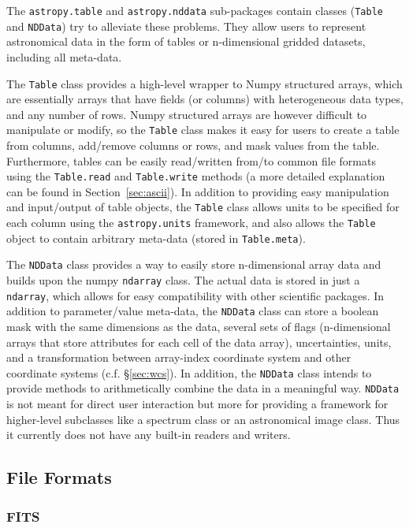 \documentclass[traditabstract]{aa}
\begin{document}
The \texttt{astropy.table} and \texttt{astropy.nddata} sub-packages contain
classes (\texttt{Table} and \texttt{NDData}) try to alleviate these problems.
They allow users to represent astronomical data in the form of tables or
n-dimensional gridded datasets, including all meta-data.

The \texttt{Table} class provides a high-level wrapper to Numpy structured
arrays, which are essentially arrays that have fields (or columns) with
heterogeneous data types, and any number of rows. Numpy structured arrays are
however difficult to manipulate or modify, so the \texttt{Table} class makes
it easy for users to create a table from columns, add/remove columns or rows,
and mask values from the table. Furthermore, tables can be easily read/written
from/to common file formats using the \texttt{Table.read} and
\texttt{Table.write} methods (a more detailed explanation can be found in
Section~\ref{sec:ascii}). In addition to providing easy manipulation and
input/output of table objects, the \texttt{Table} class allows units to be
specified for each column using the \texttt{astropy.units} framework, and also
allows the \texttt{Table} object to contain arbitrary meta-data (stored in
\texttt{Table.meta}).


The \texttt{NDData} class provides a way to easily store n-dimensional array
data and builds upon the \gls{numpy} \texttt{ndarray} class. The actual data
is stored in just a \texttt{ndarray}, which allows for easy compatibility with
other scientific packages. In addition to parameter/value meta-data, the
\texttt{NDData} class can store a boolean mask with the same dimensions as the
data, several sets of flags (n-dimensional arrays that store attributes for
each cell of the data array), uncertainties, units, and a transformation
between array-index coordinate system and other coordinate systems (c.f.
\S\ref{sec:wcs}). In addition, the \texttt{NDData} class intends to provide
methods to arithmetically combine the data in a meaningful way.
\texttt{NDData} is not meant for direct user interaction but more for
providing a framework for higher-level subclasses like a spectrum class or an
astronomical image class. Thus it currently does not have any built-in readers
and writers.

\subsection{File Formats}


\subsubsection{FITS}
\end{document}
